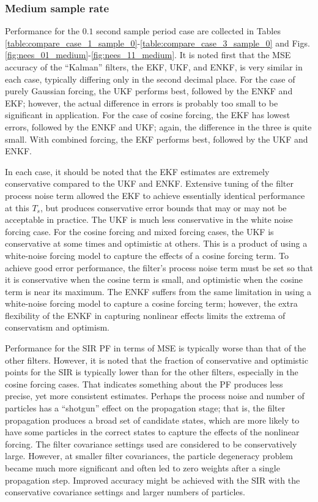 \documentclass[]{article}
\begin{document}
\subsubsection{Medium sample rate}

Performance for the $0.1$ second sample period case are collected in Tables \ref{table:compare_case_1_sample_0}-\ref{table:compare_case_3_sample_0} and Figs. \ref{fig:nees_01_medium}-\ref{fig:nees_11_medium}. It is noted first that the MSE accuracy of the ``Kalman'' filters, the EKF, UKF, and ENKF, is very similar in each case, typically differing only in the second decimal place. For the case of purely Gaussian forcing, the UKF performs best, followed by the ENKF and EKF; however, the actual difference in errors is probably too small to be significant in application. For the case of cosine forcing, the EKF has lowest errors, followed by the ENKF and UKF; again, the difference in the three is quite small. With combined forcing, the EKF performs best, followed by the UKF and ENKF.

In each case, it should be noted that the EKF estimates are extremely conservative compared to the UKF and ENKF. Extensive tuning of the filter process noise term allowed the EKF to achieve essentially identical performance at this $T_s$, but produces conservative error bounds that may or may not be acceptable in practice. The UKF is much less conservative in the white noise forcing case. For the cosine forcing and mixed forcing cases, the UKF is conservative at some times and optimistic at others. This is a product of using a white-noise forcing model to capture the effects of a cosine forcing term. To achieve good error performance, the filter's process noise term must be set so that it is conservative when the cosine term is small, and optimistic when the cosine term is near its maximum. The ENKF suffers from the same limitation in using a white-noise forcing model to capture a cosine forcing term; however, the extra flexibility of the ENKF in capturing nonlinear effects limits the extrema of conservatism and optimism.

Performance for the SIR PF in terms of MSE is typically worse than that of the other filters. However, it is noted that the fraction of conservative and optimistic points for the SIR is typically lower than for the other filters, especially in the cosine forcing cases. That indicates something about the PF produces less precise, yet more consistent estimates. Perhaps the process noise and number of particles has a ``shotgun'' effect on the propagation stage; that is, the filter propagation produces a broad set of candidate states, which are more likely to have some particles in the correct states to capture the effects of the nonlinear forcing. The filter covariance settings used are considered to be conservatively large. However, at smaller filter covariances, the particle degeneracy problem became much more significant and often led to zero weights after a single propagation step. Improved  accuracy might be achieved with the SIR with the conservative covariance settings and larger numbers of particles.
\end{document}
